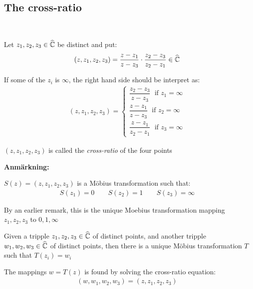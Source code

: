 \subsection{The cross-ratio}\hfill\\
\par\bigskip
\begin{theo}{}
  Let $z_1,z_2,z_3\in\widehat{\mathbb{C}}$ be distinct and put:
  \begin{equation*}
    \begin{gathered}
      (z,z_1,z_2,z_3) = \dfrac{z-z_1}{z-z_3}\cdot\dfrac{z_2-z_3}{z_2-z_1}\in\widehat{\mathbb{C}}
    \end{gathered}
  \end{equation*}
  \par\bigskip
  \noindent If some of the $z_i$ is $\infty$, the right hand side should be interpret as:
  \begin{equation*}
    \begin{gathered}
      (z,z_1,z_2,z_3)= 
      \begin{cases}
        \dfrac{z_2-z_3}{z-z_3}\;\text{ if } z_1=\infty\\
        \dfrac{z-z_1}{z-z_3}\;\text{ if } z_2=\infty\\
        \dfrac{z-z_1}{z_2-z_1}\;\text{ if } z_3 = \infty
      \end{cases}
    \end{gathered}
  \end{equation*}
  \par\bigskip
  \noindent $(z,z_1,z_2,z_3)$ is called the \textit{cross-ratio} of the four points 
\end{theo}
\par\bigskip
\noindent\textbf{Anmärkning:}\par
\noindent $S(z) = (z,z_1,z_2,z_3)$ is a Möbius transformation such that:
\begin{equation*}
  \begin{gathered}
    S(z_1) = 0\qquad S(z_2) =1\qquad S(z_3) = \infty
  \end{gathered}
\end{equation*}\par
\noindent By an earlier remark, this is the unique Moebius transformation mapping $z_1,z_2,z_3$  to $0,1,\infty$
\par\bigskip
\begin{theo}[]{}
  Given a tripple $z_1,z_2,z_3\in\widehat{\mathbb{C}}$ of distinct points, and another tripple $w_1,w_2,w_3\in\widehat{\mathbb{C}}$ of distinct points, then there is a unique Möbius transformation $T$ such that $T(z_i) = w_i$
  \par\bigskip
  \noindent The mappings $w = T(z)$ is found by solving the cross-ratio equation:
  \begin{equation*}
    \begin{gathered}
      (w,w_1,w_2,w_3) = (z,z_1,z_2,z_3)
    \end{gathered}
  \end{equation*}
\end{theo}
